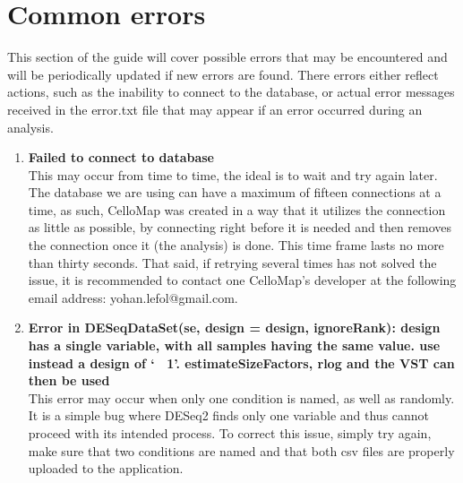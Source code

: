 \documentclass[11pt]{article}
\begin{document}
\section{Common errors \label{common_err}}
This section of the guide will cover possible errors that may be encountered and will be periodically updated if new errors are found. There errors either reflect actions, such as the inability to connect to the database, or actual error messages received in the error.txt file that may appear if an error occurred during an analysis.
\begin{enumerate}
\item \textbf{Failed to connect to database}\\
This may occur from time to time, the ideal is to wait and try again later. The database we are using can have a maximum of fifteen connections at a time, as such, CelloMap was created in a way that it utilizes the connection as little as possible, by connecting right before it is needed and then removes the connection once it (the analysis) is done. This time frame lasts no more than thirty seconds.
That said, if retrying several times has not solved the issue, it is recommended to contact one CelloMap's developer at the following email address: yohan.lefol@gmail.com.

\item \textbf{Error in DESeqDataSet(se, design = design, ignoreRank): design has a single variable, with all samples having the same value. use instead a design of `~ 1'. estimateSizeFactors, rlog and the VST can then be used}\\
This error may occur when only one condition is named, as well as randomly. It is a simple bug where \acrshort{DESeq2} finds only one variable and thus cannot proceed with its intended process.
To correct this issue, simply try again, make sure that two conditions are named and that both \acrshort{csv} files are properly uploaded to the application.
  
\end{enumerate}


\printglossary[type=\acronymtype]



\end{document}
